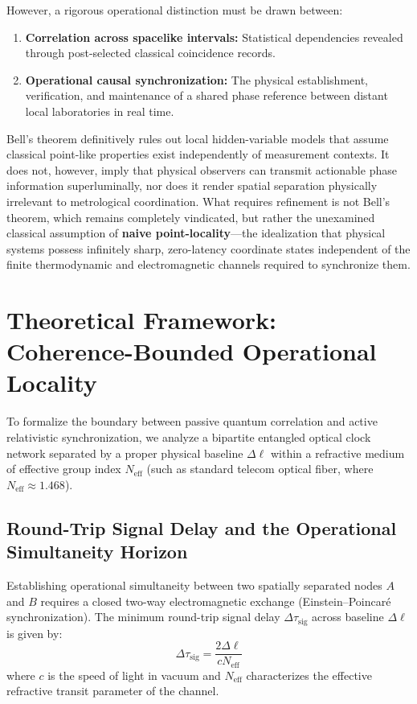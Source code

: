 \documentclass[11pt,a4paper]{article}
\begin{document}
However, a rigorous operational distinction must be drawn between:
\begin{enumerate}
    \item \textbf{Correlation across spacelike intervals:} Statistical dependencies revealed through post-selected classical coincidence records.
    \item \textbf{Operational causal synchronization:} The physical establishment, verification, and maintenance of a shared phase reference between distant local laboratories in real time.
\end{enumerate}

Bell's theorem definitively rules out local hidden-variable models that assume classical point-like properties exist independently of measurement contexts. It does not, however, imply that physical observers can transmit actionable phase information superluminally, nor does it render spatial separation physically irrelevant to metrological coordination. What requires refinement is not Bell's theorem, which remains completely vindicated, but rather the unexamined classical assumption of \textbf{naive point-locality}---the idealization that physical systems possess infinitely sharp, zero-latency coordinate states independent of the finite thermodynamic and electromagnetic channels required to synchronize them.

\section{Theoretical Framework: Coherence-Bounded Operational Locality}

To formalize the boundary between passive quantum correlation and active relativistic synchronization, we analyze a bipartite entangled optical clock network separated by a proper physical baseline $\Delta\ell$ within a refractive medium of effective group index $N_{\mathrm{eff}}$ (such as standard telecom optical fiber, where $N_{\mathrm{eff}} \approx 1.468$).

\subsection{Round-Trip Signal Delay and the Operational Simultaneity Horizon}

Establishing operational simultaneity between two spatially separated nodes $A$ and $B$ requires a closed two-way electromagnetic exchange (Einstein--Poincar\'{e} synchronization). The minimum round-trip signal delay $\Delta\tau_{\mathrm{sig}}$ across baseline $\Delta\ell$ is given by:
\begin{equation}
    \Delta\tau_{\mathrm{sig}} = \frac{2 \Delta\ell}{c N_{\mathrm{eff}}}
    \label{eq:roundtrip}
\end{equation}
where $c$ is the speed of light in vacuum and $N_{\mathrm{eff}}$ characterizes the effective refractive transit parameter of the channel.
\end{document}
